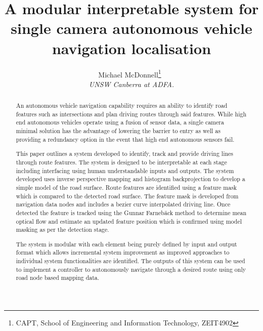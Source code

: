 \documentclass[]{aiaa-tc}%
\title{A modular interpretable system for single camera autonomous vehicle navigation localisation}
\author{
  Michael McDonnell\thanks{CAPT, School of Engineering and Information Technology, ZEIT4902}\
  \\
  {\normalsize\itshape
   UNSW Canberra at ADFA.}\\
  }
\begin{document}
\maketitle


\begin{abstract}

An autonomous vehicle navigation capability requires an ability to identify road features such as intersections and plan driving routes through said features. While high end autonomous vehicles operate using a fusion of sensor data, a single camera minimal solution has the advantage of lowering the barrier to entry as well as providing a redundancy option in the event that high end autonomous sensors fail.

This paper outlines a system developed to identify, track and provide driving lines through route features. The system is designed to be interpretable at each stage including interfacing using human understandable inputs and outputs. The system developed uses inverse perspective mapping and histogram backprojection to develop a simple model of the road surface. Route features are identified using a feature mask which is compared to the detected road surface. The feature mask is developed from navigation data nodes and includes a bezier curve interpolated driving line. Once detected the feature is tracked using the Gunnar Farneb{\"a}ck method to determine mean optical flow and estimate an updated feature position which is confirmed using model masking as per the detection stage.

The system is modular with each element being purely defined by input and output format which allows incremental system improvement as improved approaches to individual system functionalities are identified. The outputs of this system can be used to implement a controller to autonomously navigate through a desired route using only road node based mapping data.

\end{abstract}
%
%
%
%
%
\end{document}
